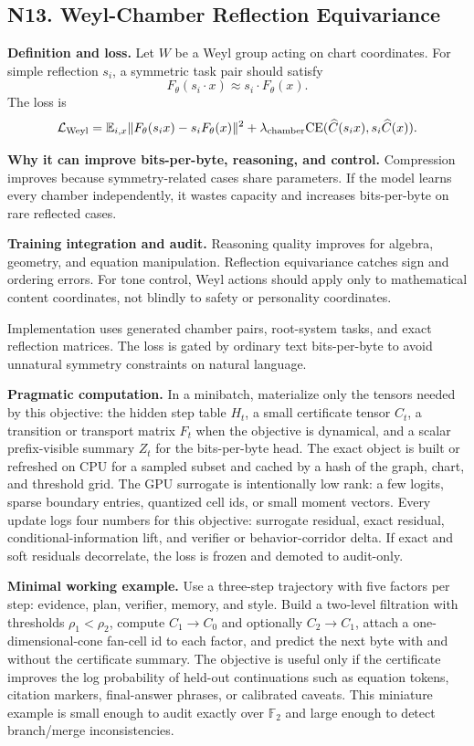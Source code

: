 \documentclass[10pt]{article}
\newcommand{\FF}{\mathbb{F}}
\newcommand{\loss}{\mathcal{L}}
\numberwithin{equation}{section}
\begin{document}
\subsection{N13. Weyl-Chamber Reflection Equivariance}
\noindent\textbf{Definition and loss.} Let $W$ be a Weyl group acting on chart coordinates. For simple reflection $s_i$, a symmetric task pair should satisfy
\[
F_\theta(s_i\cdot x)\approx s_i\cdot F_\theta(x).
\]
The loss is
\[
\loss_{\rm Weyl}=\mathbb E_{i,x}\|F_\theta(s_i x)-s_iF_\theta(x)\|^2+\lambda_{\rm chamber}\mathrm{CE}(\widehat C(s_i x),s_i\widehat C(x)).
\]

\noindent\textbf{Why it can improve bits-per-byte, reasoning, and control.} Compression improves because symmetry-related cases share parameters. If the model learns every chamber independently, it wastes capacity and increases bits-per-byte on rare reflected cases.

\noindent\textbf{Training integration and audit.} Reasoning quality improves for algebra, geometry, and equation manipulation. Reflection equivariance catches sign and ordering errors. For tone control, Weyl actions should apply only to mathematical content coordinates, not blindly to safety or personality coordinates.

Implementation uses generated chamber pairs, root-system tasks, and exact reflection matrices. The loss is gated by ordinary text bits-per-byte to avoid unnatural symmetry constraints on natural language.

\noindent\textbf{Pragmatic computation.} In a minibatch, materialize only the tensors needed by this objective: the hidden step table $H_t$, a small certificate tensor $C_t$, a transition or transport matrix $F_t$ when the objective is dynamical, and a scalar prefix-visible summary $Z_t$ for the bits-per-byte head. The exact object is built or refreshed on CPU for a sampled subset and cached by a hash of the graph, chart, and threshold grid. The GPU surrogate is intentionally low rank: a few logits, sparse boundary entries, quantized cell ids, or small moment vectors. Every update logs four numbers for this objective: surrogate residual, exact residual, conditional-information lift, and verifier or behavior-corridor delta. If exact and soft residuals decorrelate, the loss is frozen and demoted to audit-only.

\noindent\textbf{Minimal working example.} Use a three-step trajectory with five factors per step: evidence, plan, verifier, memory, and style. Build a two-level filtration with thresholds $\rho_1<\rho_2$, compute $C_1\to C_0$ and optionally $C_2\to C_1$, attach a one-dimensional-cone fan-cell id to each factor, and predict the next byte with and without the certificate summary. The objective is useful only if the certificate improves the log probability of held-out continuations such as equation tokens, citation markers, final-answer phrases, or calibrated caveats. This miniature example is small enough to audit exactly over $\FF_2$ and large enough to detect branch/merge inconsistencies.
\end{document}
